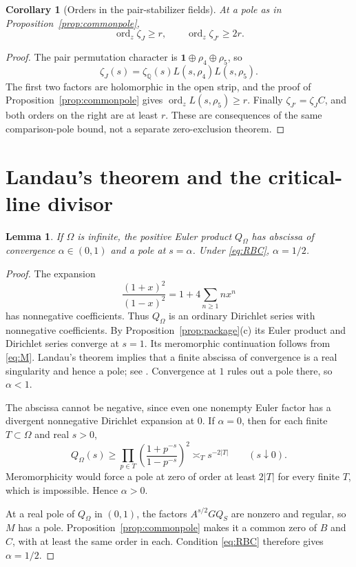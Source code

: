\documentclass[11pt]{article}
\newtheorem{lemma}[theorem]{Lemma}
\newtheorem{corollary}[theorem]{Corollary}
\theoremstyle{definition}
\theoremstyle{remark}
\newcommand{\Q}{\mathbb Q}
\newcommand{\ord}{\operatorname{ord}}
\newcommand{\one}{\mathbf 1}
\newcommand{\rh}{\rho_5}
\numberwithin{equation}{section}
\begin{document}
\begin{corollary}[Orders in the pair-stabilizer fields]\label{cor:pairfieldorders}
At a pole as in Proposition~\ref{prop:commonpole},
\[
\ord_z\zeta_J\ge r,\qquad \ord_z\zeta_{J'}\ge2r.
\]
\end{corollary}

\begin{proof}
The pair permutation character is $\one\oplus\rho_4\oplus\rh$, so
\[
\zeta_J(s)=\zeta_{\Q}(s)L(s,\rho_4)L(s,\rh).
\]
The first two factors are holomorphic in the open strip, and the proof of Proposition~\ref{prop:commonpole} gives $\ord_zL(s,\rh)\ge r$. Finally $\zeta_{J'}=\zeta_J C$, and both orders on the right are at least $r$. These are consequences of the same comparison-pole bound, not a separate zero-exclusion theorem.
\end{proof}

\section{Landau's theorem and the critical-line divisor}

\begin{lemma}\label{lem:abscissa}
If $\Omega$ is infinite, the positive Euler product $Q_\Omega$ has abscissa of convergence $\alpha\in(0,1)$ and a pole at $s=\alpha$. Under \eqref{eq:RBC}, $\alpha=1/2$.
\end{lemma}

\begin{proof}
The expansion
\[
\frac{(1+x)^2}{(1-x)^2}=1+4\sum_{n\ge1}nx^n
\]
has nonnegative coefficients. Thus $Q_\Omega$ is an ordinary Dirichlet series with nonnegative coefficients. By Proposition~\ref{prop:package}(c) its Euler product and Dirichlet series converge at $s=1$. Its meromorphic continuation follows from \eqref{eq:M}. Landau's theorem implies that a finite abscissa of convergence is a real singularity and hence a pole; see \citet[Lemma 4.9]{calegari}. Convergence at $1$ rules out a pole there, so $\alpha<1$.

The abscissa cannot be negative, since even one nonempty Euler factor has a divergent nonnegative Dirichlet expansion at $0$. If $\alpha=0$, then for each finite $T\subset\Omega$ and real $s>0$,
\[
Q_\Omega(s)\ge\prod_{p\in T}
\left(\frac{1+p^{-s}}{1-p^{-s}}\right)^2
\asymp_T s^{-2|T|}\qquad(s\downarrow0).
\]
Meromorphicity would force a pole at zero of order at least $2|T|$ for every finite $T$, which is impossible. Hence $\alpha>0$.

At a real pole of $Q_\Omega$ in $(0,1)$, the factors $A^{s/2}GQ_S$ are nonzero and regular, so $M$ has a pole. Proposition~\ref{prop:commonpole} makes it a common zero of $B$ and $C$, with at least the same order in each. Condition \eqref{eq:RBC} therefore gives $\alpha=1/2$.
\end{proof}
\end{document}
